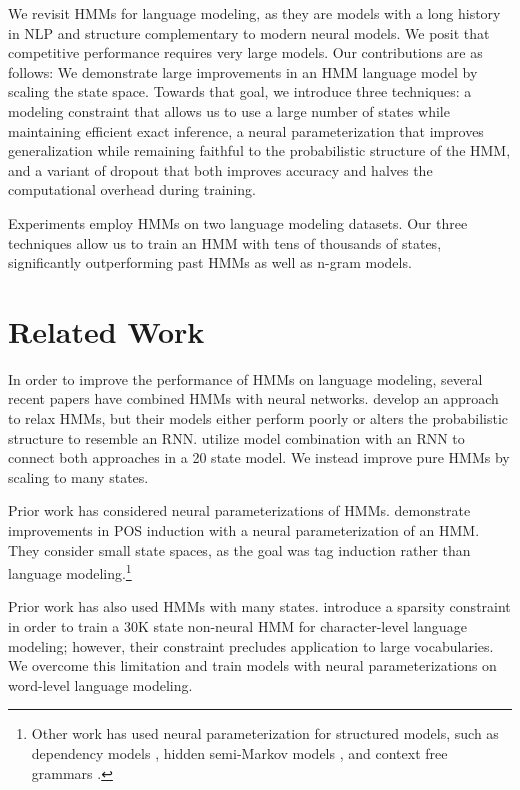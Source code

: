 \documentclass[11pt,a4paper]{article}
\begin{document}
We revisit HMMs for language modeling,
as they are models with a long history in NLP 
and structure complementary to modern neural models.
We posit that competitive performance requires very large models. 
Our contributions are as follows:
We demonstrate large improvements in an HMM language model by scaling the state space.
Towards that goal, we introduce three techniques:
a modeling constraint that allows us to use a large number of states 
while maintaining efficient exact inference,
a neural parameterization that improves
generalization while remaining faithful to the
probabilistic structure of the HMM,
and a variant of dropout that both improves accuracy
and halves the computational overhead during training. 

Experiments employ HMMs on two language modeling datasets.
Our three techniques allow us to train an HMM with tens of thousands of states,
significantly outperforming past HMMs as well as n-gram models.

\section{Related Work}
\label{sec:rw}
In order to improve the performance of HMMs on language modeling,
several recent papers have combined HMMs with neural networks.
\citet{buys2018hmm} develop an approach to relax HMMs,
but their models either perform poorly or alters the probabilistic structure to resemble an RNN. 
\citet{krakovna2016hmm} utilize model combination with an RNN to connect both approaches in a
20 state model.
We instead improve pure HMMs by scaling to many states.

Prior work has considered neural parameterizations of HMMs. 
\citet{tran2016hmm} demonstrate improvements in POS induction with a
neural parameterization of an HMM.
They consider small state spaces,
as the goal was tag induction rather than language modeling.\footnote{
Other work has used neural parameterization for structured models, such as 
dependency models \citep{han2017dependency},
hidden semi-Markov models \citep{wiseman2018hsmm},
and context free grammars \citep{kim2019cpcfg}.
}

Prior work has also used HMMs with many states.
\citet{dedieu2019learning} introduce a sparsity constraint
in order to train a 30K state non-neural HMM for character-level language modeling;
however, their constraint precludes application to large vocabularies.
We overcome this limitation and train models with 
neural parameterizations on word-level language modeling.
\end{document}
